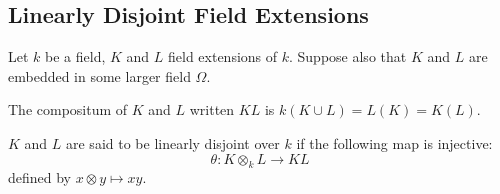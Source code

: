 \subsection{Linearly Disjoint Field Extensions}
Let $k$ be a field, $K$ and $L$ field extensions of $k$. Suppose also that $K$ and $L$ are embedded in some larger field $\Omega$. 

\begin{definition} The compositum of $K$ and $L$ written $KL$ is $k(K\cup L)=L(K)=K(L)$. 
\end{definition}



\begin{definition} $K$ and $L$ are said to be linearly disjoint over $k$ if the following map is injective:
\begin{equation} \theta: K\otimes_k L\rightarrow KL \end{equation} defined by $x\otimes y\mapsto xy$. 
\end{definition}


